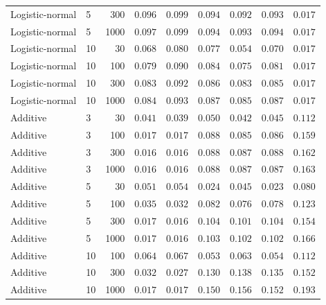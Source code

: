 \begin{tabular}{llrcccccc}
Logistic-normal & 5 & 300 & $0.096$ & $0.099$ & $0.094$ & $0.092$ & $0.093$ & $\mathbf{0.017}$\\
Logistic-normal & 5 & 1000 & $0.097$ & $0.099$ & $0.094$ & $0.093$ & $0.094$ & $\mathbf{0.017}$\\
Logistic-normal & 10 & 30 & $0.068$ & $0.080$ & $0.077$ & $0.054$ & $0.070$ & $\mathbf{0.017}$\\
Logistic-normal & 10 & 100 & $0.079$ & $0.090$ & $0.084$ & $0.075$ & $0.081$ & $\mathbf{0.017}$\\
Logistic-normal & 10 & 300 & $0.083$ & $0.092$ & $0.086$ & $0.083$ & $0.085$ & $\mathbf{0.017}$\\
Logistic-normal & 10 & 1000 & $0.084$ & $0.093$ & $0.087$ & $0.085$ & $0.087$ & $\mathbf{0.017}$\\
Additive & 3 & 30 & $\mathbf{0.041}$ & $\mathbf{0.039}$ & $0.050$ & $0.042$ & $0.045$ & $0.112$\\
Additive & 3 & 100 & $\mathbf{0.017}$ & $\mathbf{0.017}$ & $0.088$ & $0.085$ & $0.086$ & $0.159$\\
Additive & 3 & 300 & $\mathbf{0.016}$ & $\mathbf{0.016}$ & $0.088$ & $0.087$ & $0.088$ & $0.162$\\
Additive & 3 & 1000 & $\mathbf{0.016}$ & $\mathbf{0.016}$ & $0.088$ & $0.087$ & $0.087$ & $0.163$\\
Additive & 5 & 30 & $0.051$ & $0.054$ & $\mathbf{0.024}$ & $0.045$ & $\mathbf{0.023}$ & $0.080$\\
Additive & 5 & 100 & $0.035$ & $\mathbf{0.032}$ & $0.082$ & $0.076$ & $0.078$ & $0.123$\\
Additive & 5 & 300 & $\mathbf{0.017}$ & $\mathbf{0.016}$ & $0.104$ & $0.101$ & $0.104$ & $0.154$\\
Additive & 5 & 1000 & $\mathbf{0.017}$ & $\mathbf{0.016}$ & $0.103$ & $0.102$ & $0.102$ & $0.166$\\
Additive & 10 & 100 & $0.064$ & $0.067$ & $\mathbf{0.053}$ & $0.063$ & $\mathbf{0.054}$ & $0.112$\\
Additive & 10 & 300 & $0.032$ & $\mathbf{0.027}$ & $0.130$ & $0.138$ & $0.135$ & $0.152$\\
Additive & 10 & 1000 & $\mathbf{0.017}$ & $\mathbf{0.017}$ & $0.150$ & $0.156$ & $0.152$ & $0.193$\\
\bottomrule\end{tabular}
